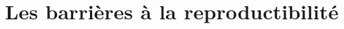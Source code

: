 \documentclass[aspectratio=169,10pt,xcolor=x11names,english,french]{beamer}
\newcommand{\code}[1]{\textcolor{code}{\texttt{#1}}}
\begin{document}
	\section{Les barrières à la reproductibilité}
	
\end{document}
